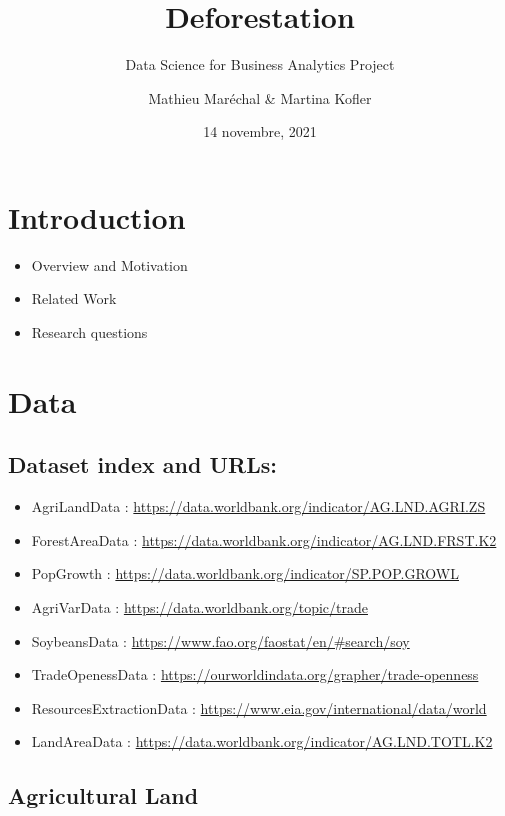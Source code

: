 \documentclass[
]{article}
\title{Deforestation}
\subtitle{Data Science for Business Analytics Project}
\author{Mathieu Maréchal \& Martina Kofler}
\date{14 novembre, 2021}
\providecommand{\tightlist}{%
  \setlength{\itemsep}{0pt}\setlength{\parskip}{0pt}}
\begin{document}
\maketitle

\hypertarget{introduction}{%
\section{Introduction}\label{introduction}}

\begin{itemize}
\tightlist
\item
  Overview and Motivation
\item
  Related Work
\item
  Research questions
\end{itemize}

\hypertarget{data}{%
\section{Data}\label{data}}

\hypertarget{dataset-index-and-urls}{%
\subsection{Dataset index and URLs:}\label{dataset-index-and-urls}}

\begin{itemize}
\item
  AgriLandData :
  \url{https://data.worldbank.org/indicator/AG.LND.AGRI.ZS}
\item
  ForestAreaData :
  \url{https://data.worldbank.org/indicator/AG.LND.FRST.K2}
\item
  PopGrowth : \url{https://data.worldbank.org/indicator/SP.POP.GROWL}
\item
  AgriVarData : \url{https://data.worldbank.org/topic/trade}
\item
  SoybeansData : \url{https://www.fao.org/faostat/en/\#search/soy}
\item
  TradeOpenessData :
  \url{https://ourworldindata.org/grapher/trade-openness}
\item
  ResourcesExtractionData :
  \url{https://www.eia.gov/international/data/world}
\item
  LandAreaData :
  \url{https://data.worldbank.org/indicator/AG.LND.TOTL.K2}
\end{itemize}

\hypertarget{agricultural-land}{%
\subsection{Agricultural Land}\label{agricultural-land}}
\end{document}
